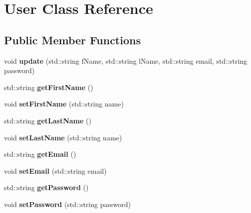 \hypertarget{class_user}{}\section{User Class Reference}
\label{class_user}
\subsection*{Public Member Functions}
\begin{DoxyCompactItemize}
\item 
\mbox{\label{class_user_a987478b9232714d3c9ad19b39a4aacaa}} 
void {\bfseries update} (std\+::string f\+Name, std\+::string l\+Name, std\+::string email, std\+::string password)
\item 
\mbox{\label{class_user_a916b23414c3e97507a5b0a1ece77aede}} 
std\+::string {\bfseries get\+First\+Name} ()
\item 
\mbox{\label{class_user_ab7454a2f8081f9d69fb67621013dbb91}} 
void {\bfseries set\+First\+Name} (std\+::string name)
\item 
\mbox{\label{class_user_a4d2dccad8093c31a64fb461ac8e42160}} 
std\+::string {\bfseries get\+Last\+Name} ()
\item 
\mbox{\label{class_user_a7b98a36916f0fdf576b71dfc9ef9c1bf}} 
void {\bfseries set\+Last\+Name} (std\+::string name)
\item 
\mbox{\label{class_user_a851bfaab8e406de66700edb326c58e38}} 
std\+::string {\bfseries get\+Email} ()
\item 
\mbox{\label{class_user_a003a00af12fe873041488375f8abdccb}} 
void {\bfseries set\+Email} (std\+::string email)
\item 
\mbox{\label{class_user_a090eb9ee354cc25b2e8240b714b39d64}} 
std\+::string {\bfseries get\+Password} ()
\item 
\mbox{\label{class_user_a186d574de4e737b3a7c1c1e9eec93b33}} 
void {\bfseries set\+Password} (std\+::string password)
\end{DoxyCompactItemize}
